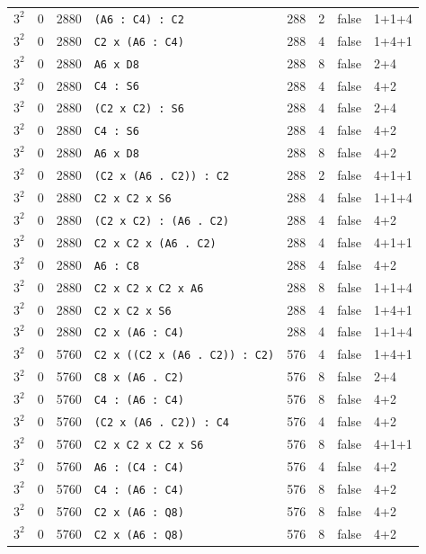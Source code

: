 \begin{longtable}{llrlrrll}
$3^2$ & 0 & 2880 & \texttt{(A6 : C4) : C2} & 288 & 2 & false & 1+1+4\\
$3^2$ & 0 & 2880 & \texttt{C2 x (A6 : C4)} & 288 & 4 & false & 1+4+1\\
$3^2$ & 0 & 2880 & \texttt{A6 x D8} & 288 & 8 & false & 2+4\\
$3^2$ & 0 & 2880 & \texttt{C4 : S6} & 288 & 4 & false & 4+2\\
$3^2$ & 0 & 2880 & \texttt{(C2 x C2) : S6} & 288 & 4 & false & 2+4\\
$3^2$ & 0 & 2880 & \texttt{C4 : S6} & 288 & 4 & false & 4+2\\
$3^2$ & 0 & 2880 & \texttt{A6 x D8} & 288 & 8 & false & 4+2\\
$3^2$ & 0 & 2880 & \texttt{(C2 x (A6 . C2)) : C2} & 288 & 2 & false & 4+1+1\\
$3^2$ & 0 & 2880 & \texttt{C2 x C2 x S6} & 288 & 4 & false & 1+1+4\\
$3^2$ & 0 & 2880 & \texttt{(C2 x C2) : (A6 . C2)} & 288 & 4 & false & 4+2\\
$3^2$ & 0 & 2880 & \texttt{C2 x C2 x (A6 . C2)} & 288 & 4 & false & 4+1+1\\
$3^2$ & 0 & 2880 & \texttt{A6 : C8} & 288 & 4 & false & 4+2\\
$3^2$ & 0 & 2880 & \texttt{C2 x C2 x C2 x A6} & 288 & 8 & false & 1+1+4\\
$3^2$ & 0 & 2880 & \texttt{C2 x C2 x S6} & 288 & 4 & false & 1+4+1\\
$3^2$ & 0 & 2880 & \texttt{C2 x (A6 : C4)} & 288 & 4 & false & 1+1+4\\
$3^2$ & 0 & 5760 & \texttt{C2 x ((C2 x (A6 . C2)) : C2)} & 576 & 4 & false & 1+4+1\\
$3^2$ & 0 & 5760 & \texttt{C8 x (A6 . C2)} & 576 & 8 & false & 2+4\\
$3^2$ & 0 & 5760 & \texttt{C4 : (A6 : C4)} & 576 & 8 & false & 4+2\\
$3^2$ & 0 & 5760 & \texttt{(C2 x (A6 . C2)) : C4} & 576 & 4 & false & 4+2\\
$3^2$ & 0 & 5760 & \texttt{C2 x C2 x C2 x S6} & 576 & 8 & false & 4+1+1\\
$3^2$ & 0 & 5760 & \texttt{A6 : (C4 : C4)} & 576 & 4 & false & 4+2\\
$3^2$ & 0 & 5760 & \texttt{C4 : (A6 : C4)} & 576 & 8 & false & 4+2\\
$3^2$ & 0 & 5760 & \texttt{C2 x (A6 : Q8)} & 576 & 8 & false & 4+2\\
$3^2$ & 0 & 5760 & \texttt{C2 x (A6 : Q8)} & 576 & 8 & false & 4+2\\

\end{longtable}

